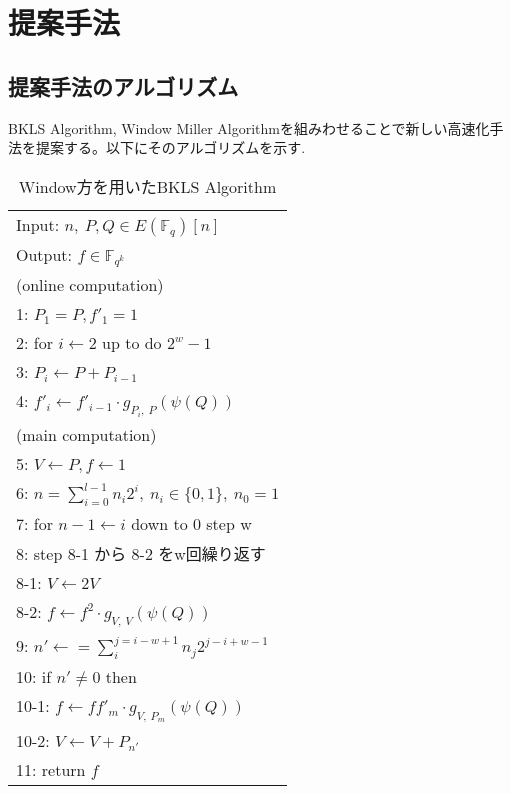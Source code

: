 \chapter{提案手法}
\section{提案手法のアルゴリズム}
BKLS Algorithm, Window Miller Algorithmを組みわせることで新しい高速化手法を提案する。以下にそのアルゴリズムを示す.
\par
\begin{table}[htbp]
 \begin{center}
  \begin{tabular}{|l|}
     \hline
     Input: $n, \ P, Q \in E(\mathbb{F}_q)[n]$ \\
     Output: $f \in \mathbb{F}_{q^k}$  \\
     \hline
     (online computation) \\
     1: \quad $P_1 = P, f'_1=1 $\\
     2: \quad for $i \gets 2$ up to do $2^w -1$\\
     3: \quad \quad $P_i \gets P + P_{i-1} $\\
     4: \quad \quad $f'_i \gets f'_{i-1} \cdot g_{P_i,\ P}(\psi (Q))$\\

     (main computation) \\
     5: \quad $V \gets P, f \gets 1 $\\
     6: \quad $n=\sum^{l - 1}_{i=0} n_i 2^i, \ n_i \in \{0,1\},\ n_0 = 1$\\

     7: \quad for $ n-1 \gets i$ down to 0 step w\\
     8: \quad step 8-1 から 8-2 をw回繰り返す\\
     8-1: \quad \quad $V \gets 2V $\\
     8-2: \quad \quad $f \gets f^2 \cdot g_{V,\ V}(\psi (Q))$\\

     9: \quad $n' \gets =\sum^{j=i-w+1}_{i} n_{j}2^{j-i+w-1} $\\
     10: \quad if $n' \neq 0$ then\\
     10-1: \quad \quad $f \gets ff'_m \cdot g_{V,\ P_m}(\psi (Q))$ \\
     10-2: \quad \quad $V \gets V + P_{n'} $\\
     11: \quad return $f$\\
     \hline
  \end{tabular}
 \end{center}
 \caption{Window方を用いたBKLS Algorithm}
\end{table}
\par
\clearpage

